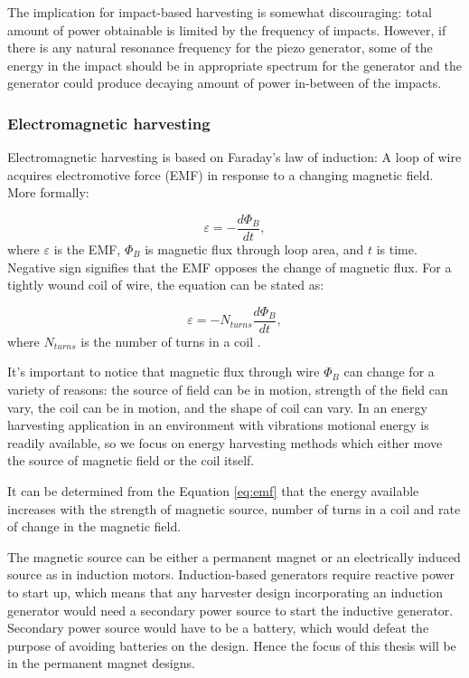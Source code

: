 The implication for impact-based harvesting is somewhat discouraging: total amount of power obtainable is limited by the frequency of impacts. However, if there is any natural resonance frequency for the piezo generator, some of the energy in the impact should be in appropriate spectrum for the generator and the generator could produce decaying amount of power in-between of the impacts.

\subsubsection{Electromagnetic harvesting} \label{sect:em_harvest}
Electromagnetic harvesting is based on Faraday's law of induction: A loop of wire acquires electromotive force (EMF) in response to a changing magnetic field. More formally:

\begin{equation}
  \varepsilon = - \frac{d \Phi_ {B}}{d t} , 
\end{equation}
where $\varepsilon$ is the EMF, $\Phi_{B}$ is magnetic flux through loop area, and $t$ is time. Negative sign signifies that the EMF opposes the change of magnetic flux. For a tightly wound coil of wire, the equation can be stated as: 

\begin{equation} \label{eq:emf}
  \varepsilon = -N_{turns} \frac{d \Phi_{B}}{d t} , 
\end{equation}
where $N_{turns}$ is the number of turns in a coil \cite[p.998]{universityphysics}.

It's important to notice that magnetic flux through wire $ \Phi_{B} $ can change for a variety of reasons: the source of field can be in motion, strength of the field can vary, the coil can be in motion, and the shape of coil can vary. In an energy harvesting application in an environment with vibrations motional energy is readily available, so we focus on energy harvesting methods which either move the source of magnetic field or the coil itself.

It can be determined from the Equation \eqref{eq:emf} that the energy available increases with the strength of magnetic source, number of turns in a coil and rate of change in the magnetic field. 

The magnetic source can be either a permanent magnet or an electrically induced source as in induction motors. Induction-based generators require reactive power to start up, which means that any harvester design incorporating an induction generator would need a secondary power source to start the inductive generator. Secondary power source would have to be a battery, which would defeat the purpose of avoiding batteries on the design. Hence the focus of this thesis will be in the permanent magnet designs.

